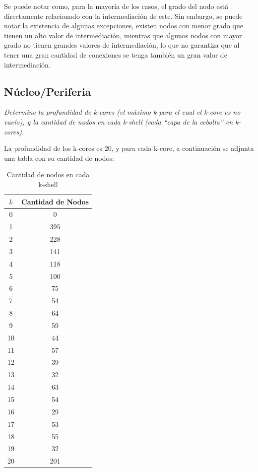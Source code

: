 \documentclass[12pt]{article}
\begin{document}
Se puede notar como, para la mayoría de los casos, el grado del nodo está directamente relacionado con la intermediación de este. Sin embargo, se puede notar la existencia de algunas excepciones, existen nodos con menor grado que tienen un alto valor de intermediación, mientras que algunos nodos con mayor grado no tienen grandes valores de intermediación, lo que no garantiza que al tener una gran cantidad de conexiones se tenga también un gran valor de intermediación.

\subsection{Núcleo/Periferia}
\textit{Determine la profundidad de k-cores (el máximo k para el cual el k-core es no vacío), y la cantidad de nodos en cada k-shell (cada “capa de la cebolla” en k-cores).}

La profundidad de los k-cores es 20, y para cada k-core, a continuación se adjunta una tabla con su cantidad de nodos:

\begin{table}[H]
    \centering
    \begin{tabular}{|c|c|}
        \hline
        \textbf{\( k \)} & \textbf{Cantidad de Nodos} \\ \hline
        0  & 0   \\ \hline
        1  & 395 \\ \hline
        2  & 228 \\ \hline
        3  & 141 \\ \hline
        4  & 118 \\ \hline
        5  & 100 \\ \hline
        6  & 75  \\ \hline
        7  & 54  \\ \hline
        8  & 64  \\ \hline
        9  & 59  \\ \hline
        10 & 44  \\ \hline
        11 & 57  \\ \hline
        12 & 39  \\ \hline
        13 & 32  \\ \hline
        14 & 63  \\ \hline
        15 & 54  \\ \hline
        16 & 29  \\ \hline
        17 & 53  \\ \hline
        18 & 55  \\ \hline
        19 & 32  \\ \hline
        20 & 201 \\ \hline
    \end{tabular}
    \caption{Cantidad de nodos en cada k-shell}
    \label{tab:k_shells}
\end{table}
\end{document}
